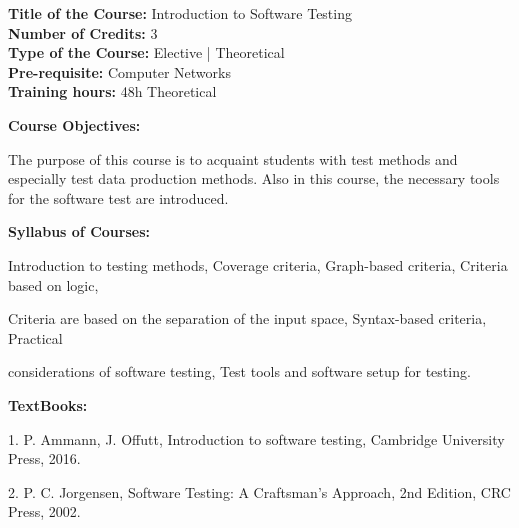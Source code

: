 \documentclass[12pt,a4paper]{article}
\begin{document}
\newpage
\textbf{Title of the Course:} Introduction to Software Testing\\
\textbf{Number of Credits:} 3\\
\textbf{Type of the Course:} Elective | Theoretical\\
\textbf{Pre-requisite:} Computer Networks\\
\textbf{Training hours:} 48h Theoretical\par\vspace{4pt}
\textbf{Course Objectives:}\par\vspace{2pt}
The purpose of this course is to acquaint students with test methods and especially test data
production methods. Also in this course, the necessary tools for the software test are introduced.\par\vspace{4pt}
\textbf{Syllabus of Courses:}\par\vspace{2pt}
Introduction to testing methods, Coverage criteria, Graph-based criteria, Criteria based on logic,\par
Criteria are based on the separation of the input space, Syntax-based criteria, Practical\par
considerations of software testing, Test tools and software setup for testing.\par\vspace{4pt}
\textbf{TextBooks:}\par\vspace{2pt}
1. P. Ammann, J. Offutt, Introduction to software testing, Cambridge University Press, 2016.\par
2. P. C. Jorgensen, Software Testing: A Craftsman's Approach, 2nd Edition, CRC Press, 2002.\par
\vspace{4pt}
\end{document}

